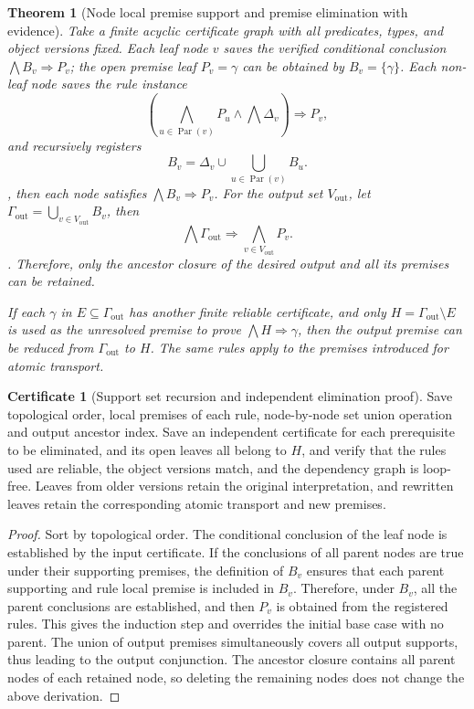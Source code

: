 \documentclass[12pt,a4paper,openany,notitlepage]{report}
\theoremstyle{plain}
\newtheorem{theorem}{Theorem}[chapter]
\theoremstyle{definition}
\newtheorem*{certificate}{Certificate}
\theoremstyle{remark}
\begin{document}
\begin{CJK*}
\begin{theorem}
[Node local premise support and premise elimination with evidence]\label{exp:gov:premise-support}
Take a finite acyclic certificate graph with all predicates, types, and object versions fixed. Each leaf node $v$ saves the verified conditional conclusion $\bigwedge B_v\Rightarrow P_v$; the open premise leaf $P_v=\gamma$ can be obtained by $B_v=\{\gamma\}$. Each non-leaf node saves the rule instance \[
 \left(\bigwedge_{u\in\operatorname{Par}(v)}P_u
       \land\bigwedge\Delta_v\right)\Rightarrow P_v,
\] and recursively registers \[
 B_v=\Delta_v\cup\bigcup_{u\in\operatorname{Par}(v)}B_u.
\], then each node satisfies $\bigwedge B_v\Rightarrow P_v$. For the output set $V_{\mathrm{out}}$, let $\Gamma_{\mathrm{out}}=\bigcup_{v\in V_{\mathrm{out}}}B_v$, then \[
 \bigwedge\Gamma_{\mathrm{out}}
 \Rightarrow\bigwedge_{v\in V_{\mathrm{out}}}P_v.
\]. Therefore, only the ancestor closure of the desired output and all its premises can be retained.

If each $\gamma$ in $E\subseteq\Gamma_{\mathrm{out}}$ has another finite reliable certificate, and only $H=\Gamma_{\mathrm{out}}\setminus E$ is used as the unresolved premise to prove $\bigwedge H\Rightarrow\gamma$, then the output premise can be reduced from $\Gamma_{\mathrm{out}}$ to $H$. The same rules apply to the premises introduced for atomic transport.\end{theorem}
\begin{certificate}
[Support set recursion and independent elimination proof]Save topological order, local premises of each rule, node-by-node set union operation and output ancestor index. Save an independent certificate for each prerequisite to be eliminated, and its open leaves all belong to $H$, and verify that the rules used are reliable, the object versions match, and the dependency graph is loop-free. Leaves from older versions retain the original interpretation, and rewritten leaves retain the corresponding atomic transport and new premises.\end{certificate}
\begin{proof}
Sort by topological order. The conditional conclusion of the leaf node is established by the input certificate. If the conclusions of all parent nodes are true under their supporting premises, the definition of $B_v$ ensures that each parent supporting and rule local premise is included in $B_v$. Therefore, under $B_v$, all the parent conclusions are established, and then $P_v$ is obtained from the registered rules. This gives the induction step and overrides the initial base case with no parent. The union of output premises simultaneously covers all output supports, thus leading to the output conjunction. The ancestor closure contains all parent nodes of each retained node, so deleting the remaining nodes does not change the above derivation.


\end{proof}
\end{CJK*}
\end{document}
